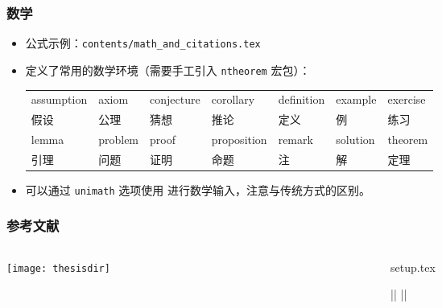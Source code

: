 \begin{frame}
  \frametitle{数学}
  \begin{itemize}
    \item 公式示例：\nolinkurl{contents/math_and_citations.tex}
    \item \SJTUThesis{} 定义了常用的数学环境（需要手工引入 \texttt{ntheorem} 宏包）：
      \begin{table}[h]
        \centering
        \footnotesize
        \begin{tabular}{*{7}{l}}\toprule
          assumption  & axiom   & conjecture & corollary    & definition  & example   & exercise  \\
          假设        & 公理    & 猜想       & 推论         & 定义        & 例        & 练习      \\\midrule
          lemma       & problem & proof      & proposition  & remark      & solution  & theorem   \\
          引理        & 问题    & 证明       & 命题         & 注          & 解        & 定理      \\\bottomrule
        \end{tabular}
      \end{table}
      \item \SJTUThesis{} 可以通过 \texttt{unimath} 选项使用  进行数学输入，注意与传统方式的区别。
  \end{itemize}
\end{frame}

\begin{frame}[fragile]
  \frametitle{参考文献}
  \begin{columns}
    \begin{column}{0.45\textwidth}
      \texttt{[image: thesisdir]}
    \end{column}
    \begin{column}{0.55\textwidth}
      \begin{codeblock}[firstnumber=111,numbersep=2pt]{setup.tex}
\usepackage[backend=biber,style=gb7714-2015]{biblatex}
\setlength{\bibitemsep}{0pt}
|\highlightline|%
|\highlightline|
      \end{codeblock}
    \end{column}
  \end{columns}
\end{frame}

